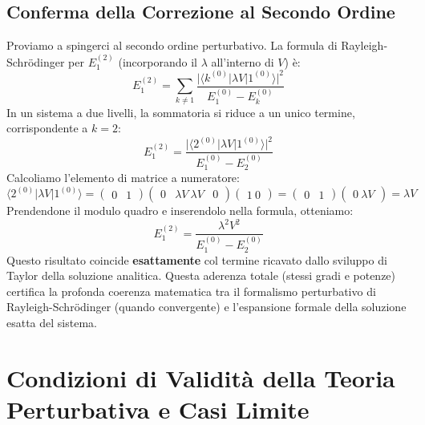 \subsection{Conferma della Correzione al Secondo Ordine}
Proviamo a spingerci al secondo ordine perturbativo. La formula di Rayleigh-Schrödinger per $E_1^{(2)}$ (incorporando il $\lambda$ all'interno di $V$) è:
\begin{equation}
E_1^{(2)} = \sum_{k \neq 1} \frac{\big| \langle k^{(0)} | \lambda V | 1^{(0)} \rangle \big|^2}{E_1^{(0)} - E_k^{(0)}}
\end{equation}
In un sistema a due livelli, la sommatoria si riduce a un unico termine, corrispondente a $k=2$:
\begin{equation}
E_1^{(2)} = \frac{\big| \langle 2^{(0)} | \lambda V | 1^{(0)} \rangle \big|^2}{E_1^{(0)} - E_2^{(0)}}
\end{equation}
Calcoliamo l'elemento di matrice a numeratore:
\begin{equation}
\langle 2^{(0)} | \lambda V | 1^{(0)} \rangle = \begin{pmatrix} 0 & 1 \end{pmatrix} \begin{pmatrix} 0 & \lambda V \ \lambda V & 0 \end{pmatrix} \begin{pmatrix} 1 \ 0 \end{pmatrix} = \begin{pmatrix} 0 & 1 \end{pmatrix} \begin{pmatrix} 0 \ \lambda V \end{pmatrix} = \lambda V
\end{equation}
Prendendone il modulo quadro e inserendolo nella formula, otteniamo:
\begin{equation}
E_1^{(2)} = \frac{\lambda^2 V^2}{E_1^{(0)} - E_2^{(0)}}
\end{equation}
Questo risultato coincide \textbf{esattamente} col termine ricavato dallo sviluppo di Taylor della soluzione analitica. Questa aderenza totale (stessi gradi e potenze) certifica la profonda coerenza matematica tra il formalismo perturbativo di Rayleigh-Schrödinger (quando convergente) e l'espansione formale della soluzione esatta del sistema.

\section{Condizioni di Validità della Teoria Perturbativa e Casi Limite}

